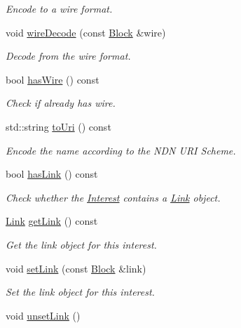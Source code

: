 \begin{DoxyCompactItemize}
\begin{DoxyCompactList}\small\item\em Encode to a wire format. \end{DoxyCompactList}\item 
void \hyperlink{classndn_1_1Interest_a112d1d1be76710e0a597a867546be6eb}{wire\+Decode} (const \hyperlink{classndn_1_1Block}{Block} \&wire)\hypertarget{classndn_1_1Interest_a112d1d1be76710e0a597a867546be6eb}{}\label{classndn_1_1Interest_a112d1d1be76710e0a597a867546be6eb}

\begin{DoxyCompactList}\small\item\em Decode from the wire format. \end{DoxyCompactList}\item 
bool \hyperlink{classndn_1_1Interest_a5566023708f1b89117b6f5496893cd41}{has\+Wire} () const\hypertarget{classndn_1_1Interest_a5566023708f1b89117b6f5496893cd41}{}\label{classndn_1_1Interest_a5566023708f1b89117b6f5496893cd41}

\begin{DoxyCompactList}\small\item\em Check if already has wire. \end{DoxyCompactList}\item 
std\+::string \hyperlink{classndn_1_1Interest_adabcd4c47526eb0b78325d2d5c2e459a}{to\+Uri} () const
\begin{DoxyCompactList}\small\item\em Encode the name according to the N\+DN U\+RI Scheme. \end{DoxyCompactList}\item 
bool \hyperlink{classndn_1_1Interest_a689d27b71b34df22bf0f5ac24daaa619}{has\+Link} () const
\begin{DoxyCompactList}\small\item\em Check whether the \hyperlink{classndn_1_1Interest}{Interest} contains a \hyperlink{classndn_1_1Link}{Link} object. \end{DoxyCompactList}\item 
\hyperlink{classndn_1_1Link}{Link} \hyperlink{classndn_1_1Interest_a1b2aad6339c0f8e2eb091ce573b1687b}{get\+Link} () const
\begin{DoxyCompactList}\small\item\em Get the link object for this interest. \end{DoxyCompactList}\item 
void \hyperlink{classndn_1_1Interest_a586136692ded13f78968cea938f9e550}{set\+Link} (const \hyperlink{classndn_1_1Block}{Block} \&link)
\begin{DoxyCompactList}\small\item\em Set the link object for this interest. \end{DoxyCompactList}\item 
void \hyperlink{classndn_1_1Interest_a7b14dbfd6eec8ed52160346b0f73e404}{unset\+Link} ()\hypertarget{classndn_1_1Interest_a7b14dbfd6eec8ed52160346b0f73e404}{}\label{classndn_1_1Interest_a7b14dbfd6eec8ed52160346b0f73e404}


\end{DoxyCompactItemize}
